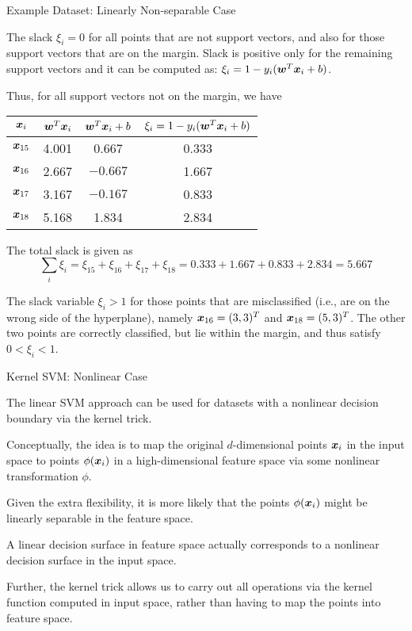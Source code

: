 \begin{frame}{Example Dataset: Linearly Non-separable Case}

The slack $\xi_i = 0$ for all points that are not support
vectors, and also for those support vectors that are on the
margin. Slack is positive only for the remaining support
vectors and it can be computed as:
    $\xi_i = 1 - y_i({\boldsymbol w}^T{\boldsymbol x}_i+b)$.

Thus, for all support vectors not on the margin, we have
\begin{center}\vspace*{10pt}\small
    {\renewcommand{\arraystretch}{1.1}\begin{tabular}{|c|c|c|c|}
        \hline
        ${\boldsymbol x}_i$ & ${\boldsymbol w}^T{\boldsymbol x}_i$ & ${\boldsymbol w}^T{\boldsymbol x}_i + b$ & $\xi_i = 1
        - y_i({\boldsymbol w}^T{\boldsymbol x}_i+b)$\\
        \hline
        ${\boldsymbol x}_{15}$ & 4.001 & 0.667 & 0.333\\
        ${\boldsymbol x}_{16}$ & 2.667 & $-0.667$ & 1.667\\
        ${\boldsymbol x}_{17}$ & 3.167 & $-0.167$ & 0.833\\
        ${\boldsymbol x}_{18}$ & 5.168 & 1.834 & 2.834\\
        \hline
    \end{tabular}}\vspace*{10pt}
\end{center}
The total slack is given as
$$\sum_i \xi_i = \xi_{15} + \xi_{16} + \xi_{17} + \xi_{18} =
0.333+ 1.667 +
0.833 + 2.834 = 5.667$$

The slack variable $\xi_i > 1$ for those points that
are misclassif\/{i}ed (i.e., are on the wrong side of the
hyperplane), namely ${\boldsymbol x}_{16} = (3,3)^T$ and ${\boldsymbol x}_{18} = (5,3)^T$.
The other two points are correctly classif\/{i}ed, but lie within the
margin, and thus satisfy $0 < \xi_i < 1$.
\end{frame}




\begin{frame}{Kernel SVM: Nonlinear Case}

The linear SVM approach can be used for datasets with a nonlinear
decision boundary via the kernel trick.

\medskip
Conceptually, the idea is to map the
original $d$-dimensional points ${\boldsymbol x}_i$ in the input space to
points $\phi({\boldsymbol x}_i)$ in a high-dimensional feature space via some
nonlinear transformation $\phi$. 

\medskip
Given the extra flexibility, it
is more likely that the points $\phi({\boldsymbol x}_i)$ might be linearly
separable in the feature space. 

\medskip
A linear
decision surface in feature space actually corresponds to a
nonlinear decision surface in the input space. 

\medskip
Further, the kernel
trick allows us to carry out all operations via the kernel
function computed in input space, rather than having to map the
points into feature space.
\end{frame}




